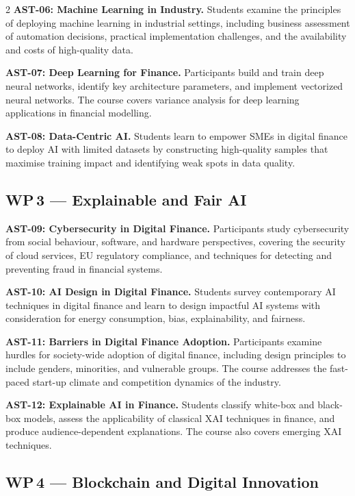\begin{multicols}{2}
\textbf{AST-06: Machine Learning in Industry.}\quad
Students examine the principles of deploying machine learning in industrial
settings, including business assessment of automation decisions, practical
implementation challenges, and the availability and costs of high-quality data.

\textbf{AST-07: Deep Learning for Finance.}\quad
Participants build and train deep neural networks, identify key architecture
parameters, and implement vectorized neural networks.  The course covers
variance analysis for deep learning applications in financial modelling.

\textbf{AST-08: Data-Centric AI.}\quad
Students learn to empower SMEs in digital finance to deploy AI with limited
datasets by constructing high-quality samples that maximise training impact
and identifying weak spots in data quality.

\subsection*{WP\,3 --- Explainable and Fair AI}

\textbf{AST-09: Cybersecurity in Digital Finance.}\quad
Participants study cybersecurity from social behaviour, software, and hardware
perspectives, covering the security of cloud services, EU regulatory compliance,
and techniques for detecting and preventing fraud in financial systems.

\columnbreak

\textbf{AST-10: AI Design in Digital Finance.}\quad
Students survey contemporary AI techniques in digital finance and learn to
design impactful AI systems with consideration for energy consumption, bias,
explainability, and fairness.

\textbf{AST-11: Barriers in Digital Finance Adoption.}\quad
Participants examine hurdles for society-wide adoption of digital finance,
including design principles to include genders, minorities, and vulnerable
groups.  The course addresses the fast-paced start-up climate and competition
dynamics of the industry.

\textbf{AST-12: Explainable AI in Finance.}\quad
Students classify white-box and black-box models, assess the applicability of
classical XAI techniques in finance, and produce audience-dependent
explanations.  The course also covers emerging XAI techniques.

\subsection*{WP\,4 --- Blockchain and Digital Innovation}


\end{multicols}
